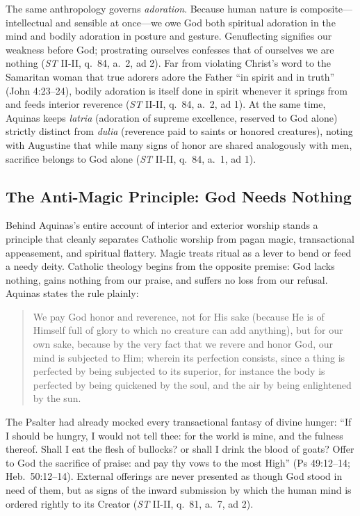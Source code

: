 The same anthropology governs \emph{adoration}. Because human nature is composite---intellectual and sensible at once---we owe God both spiritual adoration in the mind and bodily adoration in posture and gesture. Genuflecting signifies our weakness before God; prostrating ourselves confesses that of ourselves we are nothing (\emph{ST} II-II, q.\ 84, a.\ 2, ad 2). Far from violating Christ's word to the Samaritan woman that true adorers adore the Father ``in spirit and in truth'' (John 4:23--24), bodily adoration is itself done in spirit whenever it springs from and feeds interior reverence (\emph{ST} II-II, q.\ 84, a.\ 2, ad 1). At the same time, Aquinas keeps \emph{latria} (adoration of supreme excellence, reserved to God alone) strictly distinct from \emph{dulia} (reverence paid to saints or honored creatures), noting with Augustine that while many signs of honor are shared analogously with men, sacrifice belongs to God alone (\emph{ST} II-II, q.\ 84, a.\ 1, ad 1).

\subsection{The Anti-Magic Principle: God Needs Nothing}

Behind Aquinas's entire account of interior and exterior worship stands a principle that cleanly separates Catholic worship from pagan magic, transactional appeasement, and spiritual flattery. Magic treats ritual as a lever to bend or feed a needy deity. Catholic theology begins from the opposite premise: God lacks nothing, gains nothing from our praise, and suffers no loss from our refusal. Aquinas states the rule plainly:

\begin{quote}
We pay God honor and reverence, not for His sake (because He is of Himself full of glory to which no creature can add anything), but for our own sake, because by the very fact that we revere and honor God, our mind is subjected to Him; wherein its perfection consists, since a thing is perfected by being subjected to its superior, for instance the body is perfected by being quickened by the soul, and the air by being enlightened by the sun.
\end{quote}

The Psalter had already mocked every transactional fantasy of divine hunger: ``If I should be hungry, I would not tell thee: for the world is mine, and the fulness thereof. Shall I eat the flesh of bullocks? or shall I drink the blood of goats? Offer to God the sacrifice of praise: and pay thy vows to the most High'' (Ps 49:12--14; Heb.\ 50:12--14). External offerings are never presented as though God stood in need of them, but as signs of the inward submission by which the human mind is ordered rightly to its Creator (\emph{ST} II-II, q.\ 81, a.\ 7, ad 2).

